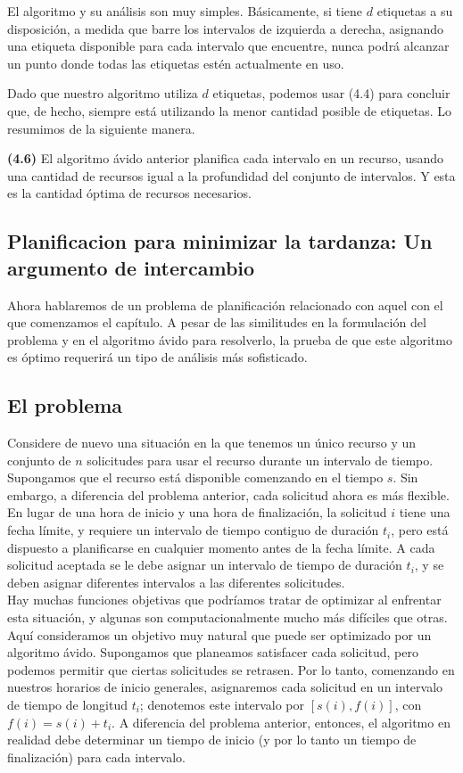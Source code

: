 \documentclass[a4paper, 12pt]{book}
\theoremstyle{dotless}
\begin{document}
El algoritmo y su análisis son muy simples. Básicamente, si tiene $d$ etiquetas a su disposición, a medida que barre los intervalos de izquierda a derecha, asignando una etiqueta disponible para cada intervalo que encuentre, nunca podrá alcanzar un punto donde todas las etiquetas estén actualmente en uso.

Dado que nuestro algoritmo utiliza $d$ etiquetas, podemos usar (4.4) para concluir que, de hecho, siempre está utilizando la menor cantidad posible de etiquetas. Lo resumimos de la siguiente manera.

\textbf{(4.6)} El algoritmo ávido anterior planifica cada intervalo en un recurso, usando una cantidad de recursos igual a la profundidad del conjunto de intervalos. Y esta es la cantidad óptima de recursos necesarios.

\subsection{Planificacion para minimizar la tardanza: Un argumento de intercambio}

Ahora hablaremos de un problema de planificación relacionado con aquel con el que comenzamos el capítulo. A pesar de las similitudes en la formulación del problema y en el algoritmo ávido para resolverlo, la prueba de que este algoritmo es óptimo requerirá un tipo de análisis más sofisticado.

\subsection*{El problema}
Considere de nuevo una situación en la que tenemos un único recurso y un conjunto de $n$ solicitudes para usar el recurso durante un intervalo de tiempo. Supongamos que el recurso está disponible comenzando en el tiempo $s$. Sin embargo, a diferencia del problema anterior, cada solicitud ahora es más flexible. En lugar de una hora de inicio y una hora de finalización, la solicitud $i$ tiene una fecha límite, y requiere un intervalo de tiempo contiguo de duración $t_i$, pero está dispuesto a planificarse en cualquier momento antes de la fecha límite. A cada solicitud aceptada se le debe asignar un intervalo de tiempo de duración $t_i$, y se deben asignar diferentes intervalos a las diferentes solicitudes.\\

Hay muchas funciones objetivas que podríamos tratar de optimizar al enfrentar esta situación, y algunas son computacionalmente mucho más difíciles que otras. Aquí consideramos un objetivo muy natural que puede ser optimizado por un algoritmo ávido. Supongamos que planeamos satisfacer cada solicitud, pero podemos permitir que ciertas solicitudes se retrasen. Por lo tanto, comenzando en nuestros horarios de inicio generales, asignaremos cada solicitud en un intervalo de tiempo de longitud $t_i$; denotemos este intervalo por $[s(i), f (i)]$, con $f(i)=s(i)+t_i$. A diferencia del problema anterior, entonces, el algoritmo en realidad debe determinar un tiempo de inicio (y por lo tanto un tiempo de finalización) para cada intervalo.\\
\end{document}
